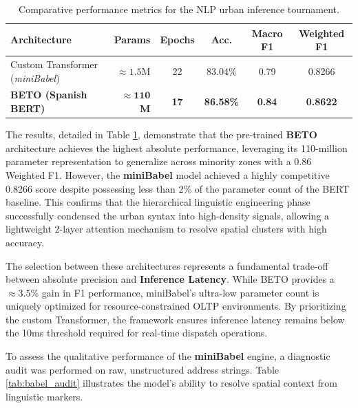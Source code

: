 \begin{table}[H]
    \centering
    \small
    \begin{tabularx}{\textwidth}{l r c c c c}
        \toprule
        \textbf{Architecture} & \textbf{Params} & \textbf{Epochs} & \textbf{Acc.} & \textbf{Macro F1} & \textbf{Weighted F1} \\
        \midrule
        Custom Transformer (\textit{miniBabel}) & $\approx 1.5$M & 22 & 83.04\% & 0.79 & 0.8266 \\
        \addlinespace
        \textbf{BETO (Spanish BERT)} & $\approx \mathbf{110}$\textbf{M} & \textbf{17} & \textbf{86.58\%} & \textbf{0.84} & \textbf{0.8622} \\
        \bottomrule
    \end{tabularx}
    \caption{Comparative performance metrics for the NLP urban inference tournament.}
    \label{tab:nlp_benchmarks}
\end{table}

The results, detailed in Table \ref{tab:nlp_benchmarks}, demonstrate that the pre-trained \textbf{BETO} architecture achieves the highest absolute performance, leveraging its 110-million parameter representation to generalize across minority zones with a 0.86 Weighted F1. However, the \textbf{miniBabel} model achieved a highly competitive 0.8266 score despite possessing less than 2\% of the parameter count of the BERT baseline. This confirms that the hierarchical linguistic engineering phase successfully condensed the urban syntax into high-density signals, allowing a lightweight 2-layer attention mechanism to resolve spatial clusters with high accuracy. 

The selection between these architectures represents a fundamental trade-off between absolute precision and \textbf{Inference Latency}. While BETO provides a $\approx 3.5$\% gain in F1 performance, miniBabel's ultra-low parameter count is uniquely optimized for resource-constrained OLTP environments. By prioritizing the custom Transformer, the framework ensures inference latency remains below the 10ms threshold required for real-time dispatch operations.

To assess the qualitative performance of the \textbf{miniBabel} engine, a diagnostic audit was performed on raw, unstructured address strings. Table \ref{tab:babel_audit} illustrates the model's ability to resolve spatial context from linguistic markers.

